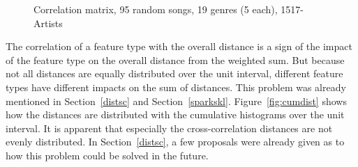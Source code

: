 \begin{figure}[htbp]
	\centering
	\caption{Correlation matrix, 95 random songs, 19 genres (5 each), 1517-Artists}
	\label{fig:corr2}
\end{figure}

\noindent The correlation of a feature type with the overall distance is a sign of the impact of the feature type on the overall distance from the weighted sum. But because not all distances are equally distributed over the unit interval, different feature types have different impacts on the sum of distances. This problem was already mentioned in Section~\ref{distsc} and Section~\ref{sparkskl}. Figure~\ref{fig:cumdist} shows how the distances are distributed with the cumulative histograms over the unit interval. It is apparent that especially the cross-correlation distances are not evenly distributed. In Section~\ref{distsc}, a few proposals were already given as to how this problem could be solved in the future. 

